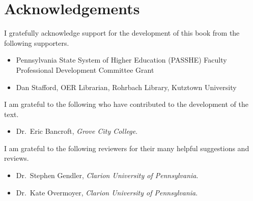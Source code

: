 \chapter*{Acknowledgements}

I gratefully acknowledge support for the development of this book from the following supporters.
\begin{itemize}
    \item Pennsylvania State System of Higher Education (PASSHE) Faculty Professional Development Committee Grant
    \item Dan Stafford, OER Librarian, Rohrbach Library, Kutztown University
\end{itemize}

\noindent I am grateful to the following who have contributed to the development of the text. 
\begin{itemize}
    \item Dr.\ Eric Bancroft, {\em Grove City College}.
\end{itemize}

\noindent I am grateful to the following reviewers for their many helpful suggestions and reviews.
\begin{itemize}
    \item Dr.\ Stephen Gendler, {\em Clarion University of Pennsylvania}.
    \item Dr.\ Kate Overmoyer, {\em Clarion University of Pennsylvania}.
\end{itemize}
